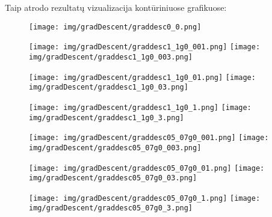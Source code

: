 \documentclass{article}
\begin{document}
Taip atrodo rezultatų vizualizacija kontūriniuose grafikuose:
\begin{figure}[H]
    \begin{adjustbox}{margin=0pt,center}
        \texttt{[image: img/gradDescent/graddesc0\_0.png]}
    \end{adjustbox}
\end{figure}
\begin{figure}[H]
    \begin{adjustbox}{margin=0pt,center}
        \texttt{[image: img/gradDescent/graddesc1\_1g0\_001.png]}
        \texttt{[image: img/gradDescent/graddesc1\_1g0\_003.png]}
    \end{adjustbox}
\end{figure}
\begin{figure}[H]
    \begin{adjustbox}{margin=0pt,center}
        \texttt{[image: img/gradDescent/graddesc1\_1g0\_01.png]}
        \texttt{[image: img/gradDescent/graddesc1\_1g0\_03.png]}
    \end{adjustbox}
\end{figure}
\begin{figure}[H]
    \begin{adjustbox}{margin=0pt,center}
        \texttt{[image: img/gradDescent/graddesc1\_1g0\_1.png]}
        \texttt{[image: img/gradDescent/graddesc1\_1g0\_3.png]}
    \end{adjustbox}
\end{figure}
\begin{figure}[H]
    \begin{adjustbox}{margin=0pt,center}
        \texttt{[image: img/gradDescent/graddesc05\_07g0\_001.png]}
        \texttt{[image: img/gradDescent/graddesc05\_07g0\_003.png]}
    \end{adjustbox}
\end{figure}
\begin{figure}[H]
    \begin{adjustbox}{margin=0pt,center}
        \texttt{[image: img/gradDescent/graddesc05\_07g0\_01.png]}
        \texttt{[image: img/gradDescent/graddesc05\_07g0\_03.png]}
    \end{adjustbox}
\end{figure}
\begin{figure}[H]
    \begin{adjustbox}{margin=0pt,center}
        \texttt{[image: img/gradDescent/graddesc05\_07g0\_1.png]}
        \texttt{[image: img/gradDescent/graddesc05\_07g0\_3.png]}
    \end{adjustbox}
\end{figure}
\end{document}
